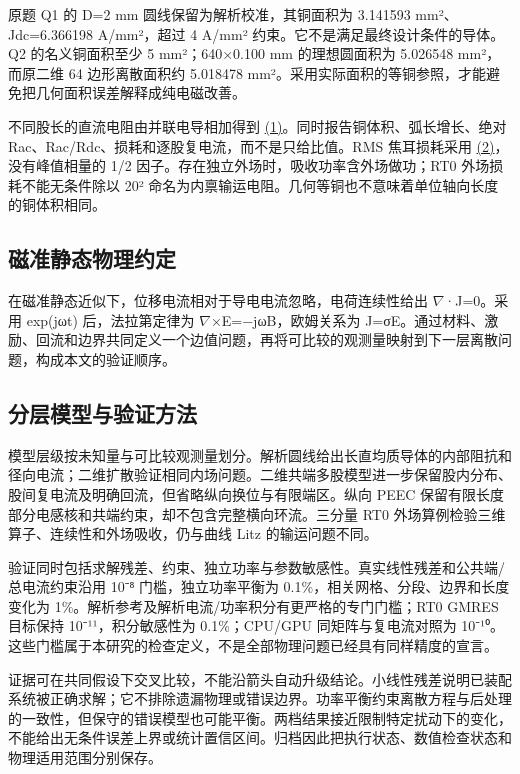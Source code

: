 \documentclass[11pt]{article}
\begin{document}
原题 Q1 的 D=2 mm 圆线保留为解析校准，其铜面积为 3.141593 mm²、Jdc=6.366198 A/mm²，超过 4 A/mm² 约束。它不是满足最终设计条件的导体。Q2 的名义铜面积至少 5 mm²；640×0.100 mm 的理想圆面积为 5.026548 mm²，而原二维 64 边形离散面积约 5.018478 mm²。采用实际面积的等铜参照，才能避免把几何面积误差解释成纯电磁改善。


不同股长的直流电阻由并联电导相加得到 \href{report_zh-CN_single.pdf#E01}{(1)}。同时报告铜体积、弧长增长、绝对 Rac、Rac/Rdc、损耗和逐股复电流，而不是只给比值。RMS 焦耳损耗采用 \href{report_zh-CN_single.pdf#E02}{(2)}，没有峰值相量的 1/2 因子。存在独立外场时，吸收功率含外场做功；RT0 外场损耗不能无条件除以 20² 命名为内禀输运电阻。几何等铜也不意味着单位轴向长度的铜体积相同。


\subsection*{磁准静态物理约定}
\hypertarget{02.maxwell.heading}{}
在磁准静态近似下，位移电流相对于导电电流忽略，电荷连续性给出 \(\nabla\)·J=0。采用 exp(jωt) 后，法拉第定律为 \(\nabla\)×E=−jωB，欧姆关系为 J=σE。通过材料、激励、回流和边界共同定义一个边值问题，再将可比较的观测量映射到下一层离散问题，构成本文的验证顺序。


\subsection*{分层模型与验证方法}
\hypertarget{02.hierarchy.heading}{}
模型层级按未知量与可比较观测量划分。解析圆线给出长直均质导体的内部阻抗和径向电流；二维扩散验证相同内场问题。二维共端多股模型进一步保留股内分布、股间复电流及明确回流，但省略纵向换位与有限端区。纵向 PEEC 保留有限长度部分电感核和共端约束，却不包含完整横向环流。三分量 RT0 外场算例检验三维算子、连续性和外场吸收，仍与曲线 Litz 的输运问题不同。


验证同时包括求解残差、约束、独立功率与参数敏感性。真实线性残差和公共端/总电流约束沿用 10⁻⁸ 门槛，独立功率平衡为 0.1\%，相关网格、分段、边界和长度变化为 1\%。解析参考及解析电流/功率积分有更严格的专门门槛；RT0 GMRES 目标保持 10⁻¹¹，积分敏感性为 0.1\%；CPU/GPU 同矩阵与复电流对照为 10⁻¹⁰。这些门槛属于本研究的检查定义，不是全部物理问题已经具有同样精度的宣言。


证据可在共同假设下交叉比较，不能沿箭头自动升级结论。小线性残差说明已装配系统被正确求解；它不排除遗漏物理或错误边界。功率平衡约束离散方程与后处理的一致性，但保守的错误模型也可能平衡。两档结果接近限制特定扰动下的变化，不能给出无条件误差上界或统计置信区间。归档因此把执行状态、数值检查状态和物理适用范围分别保存。
\end{document}
